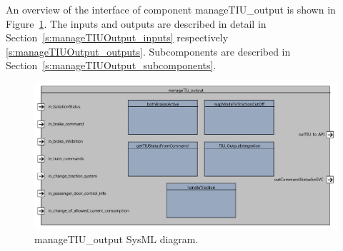 An overview of the interface of component manageTIU\_output is shown in Figure~\ref{f:manageTIUOutput}. The inputs and outputs are described in detail in Section~\ref{s:manageTIUOutput_inputs} respectively \ref{s:manageTIUOutput_outputs}. Subcomponents are described in Section~\ref{s:manageTIUOutput_subcomponents}.

\begin{figure}
\center
\includegraphics[width=\textwidth]{images/F2_13_manageTIU_output.pdf}
\caption{manageTIU\_output SysML diagram.}\label{f:manageTIUOutput}
\end{figure}


